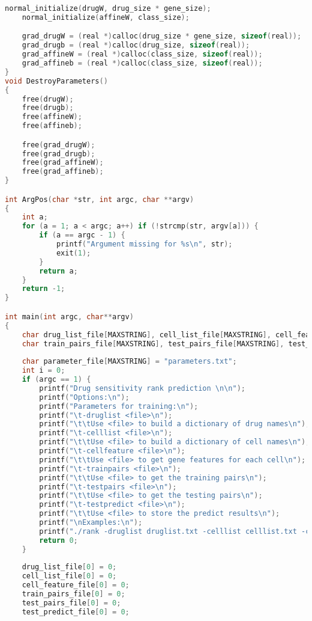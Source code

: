 \documentclass{article}
\begin{document}
\begin{lstlisting}[language=c++]
    normal_initialize(drugW, drug_size * gene_size);
    normal_initialize(affineW, class_size);

    grad_drugW = (real *)calloc(drug_size * gene_size, sizeof(real));
    grad_drugb = (real *)calloc(drug_size, sizeof(real));
    grad_affineW = (real *)calloc(class_size, sizeof(real));
    grad_affineb = (real *)calloc(class_size, sizeof(real));
}
void DestroyParameters()
{
    free(drugW);
    free(drugb);
    free(affineW);
    free(affineb);

    free(grad_drugW);
    free(grad_drugb);
    free(grad_affineW);
    free(grad_affineb);
}

int ArgPos(char *str, int argc, char **argv)
{
    int a;
    for (a = 1; a < argc; a++) if (!strcmp(str, argv[a])) {
        if (a == argc - 1) {
            printf("Argument missing for %s\n", str);
            exit(1);
        }
        return a;
    }
    return -1;
}

int main(int argc, char**argv)
{
    char drug_list_file[MAXSTRING], cell_list_file[MAXSTRING], cell_feature_file[MAXSTRING];
    char train_pairs_file[MAXSTRING], test_pairs_file[MAXSTRING], test_predict_file[MAXSTRING];
    
    char parameter_file[MAXSTRING] = "parameters.txt";
    int i = 0;
    if (argc == 1) {
        printf("Drug sensitivity rank prediction \n\n");
        printf("Options:\n");
        printf("Parameters for training:\n");
        printf("\t-druglist <file>\n");
        printf("\t\tUse <file> to build a dictionary of drug names\n");
        printf("\t-celllist <file>\n");
        printf("\t\tUse <file> to build a dictionary of cell names\n");
        printf("\t-cellfeature <file>\n");
        printf("\t\tUse <file> to get gene features for each cell\n");
        printf("\t-trainpairs <file>\n");
        printf("\t\tUse <file> to get the training pairs\n");
        printf("\t-testpairs <file>\n");
        printf("\t\tUse <file> to get the testing pairs\n");
        printf("\t-testpredict <file>\n");
        printf("\t\tUse <file> to store the predict results\n");
        printf("\nExamples:\n");
        printf("./rank -druglist druglist.txt -celllist celllist.txt -cellfeature cellfeature.txt -trainpairs trainpair.txt -testpairs testpair.txt -testpredict test_predict.csv \n\n");
        return 0;
    }
    
    drug_list_file[0] = 0;
    cell_list_file[0] = 0;
    cell_feature_file[0] = 0;
    train_pairs_file[0] = 0;
    test_pairs_file[0] = 0;
    test_predict_file[0] = 0;
               

\end{lstlisting}
\end{document}
